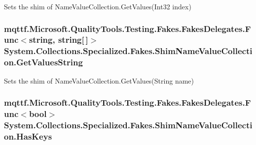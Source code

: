 Sets the shim of Name\-Value\-Collection.\-Get\-Values(\-Int32 index)

\hypertarget{class_system_1_1_collections_1_1_specialized_1_1_fakes_1_1_shim_name_value_collection_adfc5c9f3db718b9aa7e0c01663574b1e}{
\subsubsection[{Get\-Values\-String}]{\setlength{\rightskip}{0pt plus 5cm}mqttf.\-Microsoft.\-Quality\-Tools.\-Testing.\-Fakes.\-Fakes\-Delegates.\-Func$<$string, string\mbox{[}$\,$\mbox{]}$>$ System.\-Collections.\-Specialized.\-Fakes.\-Shim\-Name\-Value\-Collection.\-Get\-Values\-String\hspace{0.3cm}{\ttfamily [set]}}}\label{class_system_1_1_collections_1_1_specialized_1_1_fakes_1_1_shim_name_value_collection_adfc5c9f3db718b9aa7e0c01663574b1e}


Sets the shim of Name\-Value\-Collection.\-Get\-Values(\-String name)

\hypertarget{class_system_1_1_collections_1_1_specialized_1_1_fakes_1_1_shim_name_value_collection_a27f4476d096b6c2ba6c86ee125069ecd}{
\subsubsection[{Has\-Keys}]{\setlength{\rightskip}{0pt plus 5cm}mqttf.\-Microsoft.\-Quality\-Tools.\-Testing.\-Fakes.\-Fakes\-Delegates.\-Func$<$bool$>$ System.\-Collections.\-Specialized.\-Fakes.\-Shim\-Name\-Value\-Collection.\-Has\-Keys\hspace{0.3cm}{\ttfamily [set]}}}\label{class_system_1_1_collections_1_1_specialized_1_1_fakes_1_1_shim_name_value_collection_a27f4476d096b6c2ba6c86ee125069ecd}


